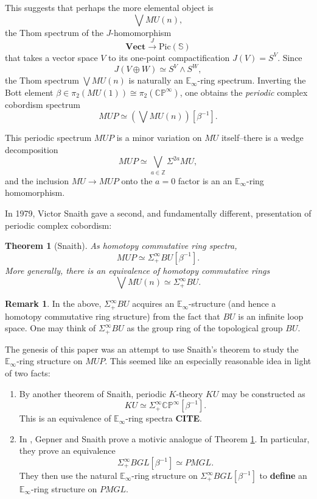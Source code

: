 \documentclass[reqno, oneside]{amsart}
\theoremstyle{definition}
\newtheorem{rmk}[nul]{Remark}
\theoremstyle{plain}
\newtheorem{thm}[nul]{Theorem}
\DeclareMathOperator{\smsh}{\wedge}
\begin{document}
This suggests that perhaps the more elemental object is $$\bigvee MU(n),$$ the Thom spectrum of the $J$-homomorphism
$$\textbf{Vect} \stackrel{J}{\longrightarrow} \text{Pic}(\mathbb{S})$$
that takes a vector space $V$ to its one-point compactification $J(V)=S^V$.  Since $$J(V \oplus W) \simeq S^V \smsh S^W,$$ the Thom spectrum $\bigvee MU(n)$
is naturally an $\mathbb{E}_\infty$-ring spectrum.  Inverting the Bott element $\beta \in \pi_2(MU(1)) \cong \pi_2(\mathbb{CP}^{\infty})$, one obtains the \textit{periodic} complex cobordism spectrum
$$MUP \simeq \left(\bigvee MU(n) \right)[\beta^{-1}].$$

This periodic spectrum $MUP$ is a minor variation on $MU$ itself--there is a wedge decomposition $$MUP \simeq \bigvee_{a \in \mathbb{Z}} \Sigma^{2a} MU,$$ and the inclusion $MU \rightarrow MUP$ onto the $a=0$ factor is an an $\mathbb{E}_\infty$-ring homomorphism.

In 1979, Victor Snaith \cite{SnaithBook} gave a second, and fundamentally different, presentation of periodic complex cobordism:

\begin{thm}[Snaith] \label{SnaithSplitting}
As homotopy commutative ring spectra, $$MUP \simeq \Sigma^{\infty}_+ BU[\beta^{-1}].$$  More generally, there is an equivalence of homotopy commutative rings
$$\bigvee MU(n) \simeq \Sigma^{\infty}_+ BU.$$
\end{thm}

\begin{rmk} In the above, $\Sigma^{\infty}_+ BU$ acquires an $\mathbb{E}_\infty$-structure (and hence a homotopy commutative ring structure) from the fact that $BU$ is an infinite loop space.  One may think of $\Sigma^{\infty}_+ BU$ as the group ring of the topological group $BU$.
\end{rmk}

The genesis of this paper was an attempt to use Snaith's theorem to study the $\mathbb{E}_\infty$-ring structure on $MUP$.  This seemed like an especially reasonable idea in light of two facts:

\begin{enumerate}
\item By another theorem of Snaith, periodic $K$-theory $KU$ may be constructed as $$KU \simeq \Sigma^{\infty}_+ \mathbb{CP}^{\infty}[\beta^{-1}].$$  This is an equivalence of $\mathbb{E}_\infty$-ring spectra \textbf{CITE}.
\item In \cite{GepnerSnaith}, Gepner and Snaith prove a motivic analogue of Theorem \ref{SnaithSplitting}.  In particular, they prove an equivalence 
$$\Sigma^{\infty}_+ BGL[\beta^{-1}] \simeq PMGL.$$
They then use the natural $\mathbb{E}_\infty$-ring structure on $\Sigma^{\infty}_+ BGL[\beta^{-1}]$ to \textbf{define} an $\mathbb{E}_\infty$-ring structure on $PMGL$. 
\end{enumerate}
\end{document}
